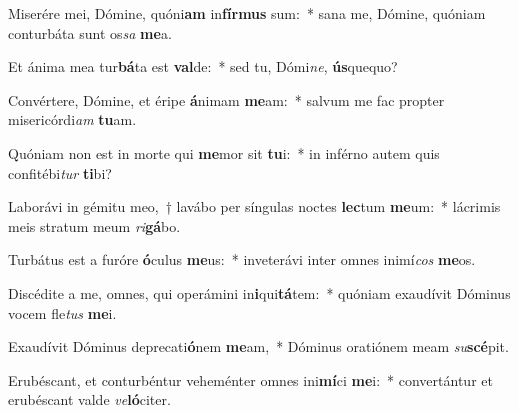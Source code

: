 \item Miserére mei, Dómine, quóni\textbf{am} in\textbf{fír}\textbf{mus} sum:~* sana me, Dómine, quóniam conturbáta sunt os\textit{sa} \textbf{me}a.
\item Et ánima mea tur\textbf{bá}ta est \textbf{val}de:~* sed tu, Dómi\textit{ne}, \textbf{ús}quequo?
\item Convértere, Dómine, et éripe \textbf{á}nimam \textbf{me}am:~* salvum me fac propter misericórdi\textit{am} \textbf{tu}am.
\item Quóniam non est in morte qui \textbf{me}mor sit \textbf{tu}i:~* in inférno autem quis confitébi\textit{tur} \textbf{ti}bi?
\item Laborávi in gémitu meo,~† lavábo per síngulas noctes \textbf{lec}tum \textbf{me}um:~* lácrimis meis stratum meum \textit{ri}\textbf{gá}bo.
\item Turbátus est a furóre \textbf{ó}culus \textbf{me}us:~* inveterávi inter omnes inimí\textit{cos} \textbf{me}os.
\item Discédite a me, omnes, qui operámini in\textbf{i}qui\textbf{tá}tem:~* quóniam exaudívit Dóminus vocem fle\textit{tus} \textbf{me}i.
\item Exaudívit Dóminus deprecati\textbf{ó}nem \textbf{me}am,~* Dóminus oratiónem meam \textit{su}\textbf{scé}pit.
\item Erubéscant, et conturbéntur veheménter omnes ini\textbf{mí}ci \textbf{me}i:~* convertántur et erubéscant valde \textit{ve}\textbf{ló}citer.
